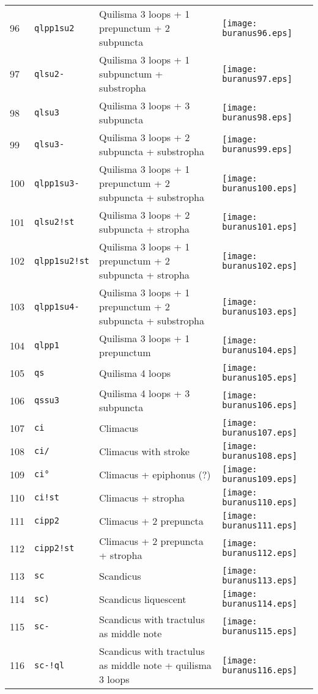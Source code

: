 \documentclass{scrarticle}
\begin{document}
\begin{longtable}{l|l|l|l}
96 & \texttt{qlpp1su2} & Quilisma 3 loops + 1 prepunctum + 2 subpuncta & \texttt{[image: buranus96.eps]} \\
97 & \texttt{qlsu2-} & Quilisma 3 loops + 1 subpunctum + substropha & \texttt{[image: buranus97.eps]} \\
98 & \texttt{qlsu3} & Quilisma 3 loops + 3 subpuncta & \texttt{[image: buranus98.eps]} \\
99 & \texttt{qlsu3-} & Quilisma 3 loops + 2 subpuncta + substropha & \texttt{[image: buranus99.eps]} \\
100 & \texttt{qlpp1su3-} & Quilisma 3 loops + 1 prepunctum + 2 subpuncta + substropha & \texttt{[image: buranus100.eps]} \\
101 & \texttt{qlsu2!st} & Quilisma 3 loops + 2 subpuncta + stropha & \texttt{[image: buranus101.eps]} \\
102 & \texttt{qlpp1su2!st} & Quilisma 3 loops + 1 prepunctum + 2 subpuncta + stropha & \texttt{[image: buranus102.eps]} \\
103 & \texttt{qlpp1su4-} & Quilisma 3 loops + 1 prepunctum + 2 subpuncta + substropha & \texttt{[image: buranus103.eps]} \\
104 & \texttt{qlpp1} & Quilisma 3 loops + 1 prepunctum & \texttt{[image: buranus104.eps]} \\
105 & \texttt{qs} & Quilisma 4 loops & \texttt{[image: buranus105.eps]} \\
106 & \texttt{qssu3} & Quilisma 4 loops + 3 subpuncta & \texttt{[image: buranus106.eps]} \\
107 & \texttt{ci} & Climacus & \texttt{[image: buranus107.eps]} \\
108 & \texttt{ci/} & Climacus with stroke & \texttt{[image: buranus108.eps]} \\
109 & \texttt{ci°} & Climacus + epiphonus (?) & \texttt{[image: buranus109.eps]} \\
110 & \texttt{ci!st} & Climacus + stropha & \texttt{[image: buranus110.eps]} \\
111 & \texttt{cipp2} & Climacus + 2 prepuncta & \texttt{[image: buranus111.eps]} \\
112 & \texttt{cipp2!st} & Climacus + 2 prepuncta + stropha & \texttt{[image: buranus112.eps]} \\
113 & \texttt{sc} & Scandicus & \texttt{[image: buranus113.eps]} \\
114 & \texttt{sc)} & Scandicus liquescent & \texttt{[image: buranus114.eps]} \\
115 & \texttt{sc-} & Scandicus with tractulus as middle note & \texttt{[image: buranus115.eps]} \\
116 & \texttt{sc-!ql} & Scandicus with tractulus as middle note + quilisma 3 loops & \texttt{[image: buranus116.eps]} \\\end{longtable}
\end{document}
